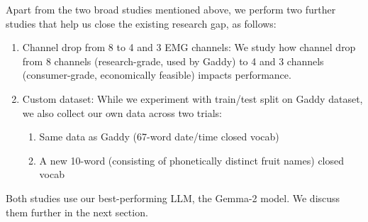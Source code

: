 Apart from the two broad studies mentioned above, we perform two further studies that help us close the existing research gap, as follows:

\begin{enumerate}
    \item Channel drop from 8 to 4 and 3 EMG channels: We study how channel drop from 8 channels (research-grade, used by Gaddy) to 4 and 3 channels (consumer-grade, economically feasible) impacts performance.
    \item Custom dataset: While we experiment with train/test split on Gaddy dataset, we also collect our own data across two trials:
    \begin{enumerate}
        \item[i.] Same data as Gaddy (67-word date/time closed vocab)
        \item[ii.] A new 10-word (consisting of phonetically distinct fruit names) closed vocab
    \end{enumerate}
\end{enumerate}

Both studies use our best-performing LLM, the Gemma-2 model. We discuss them further in the next section.
